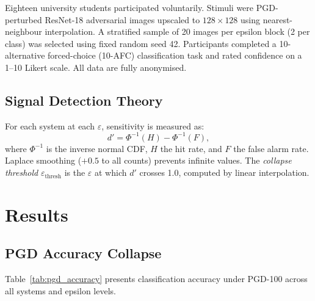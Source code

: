 \documentclass[12pt,a4paper]{article}
\begin{document}
Eighteen university students participated voluntarily.
Stimuli were PGD-perturbed ResNet-18 adversarial images upscaled to
$128{\times}128$ using nearest-neighbour interpolation.
A stratified sample of 20 images per epsilon block (2 per class) was
selected using fixed random seed 42.
Participants completed a 10-alternative forced-choice (10-AFC)
classification task and rated confidence on a 1--10 Likert scale.
All data are fully anonymised.

\subsection{Signal Detection Theory}

For each system at each $\varepsilon$, sensitivity is measured as:
\begin{equation}
  d' = \Phi^{-1}(H) - \Phi^{-1}(F),
  \label{eq:dprime}
\end{equation}
where $\Phi^{-1}$ is the inverse normal CDF, $H$ the hit rate,
and $F$ the false alarm rate.
Laplace smoothing ($+0.5$ to all counts) prevents infinite values.
The \emph{collapse threshold} $\varepsilon_{\text{thresh}}$ is the
$\varepsilon$ at which $d'$ crosses 1.0, computed by linear interpolation.

\section{Results}
\label{sec:results}

\subsection{PGD Accuracy Collapse}

Table~\ref{tab:pgd_accuracy} presents classification accuracy under PGD-100
across all systems and epsilon levels.
\end{document}
